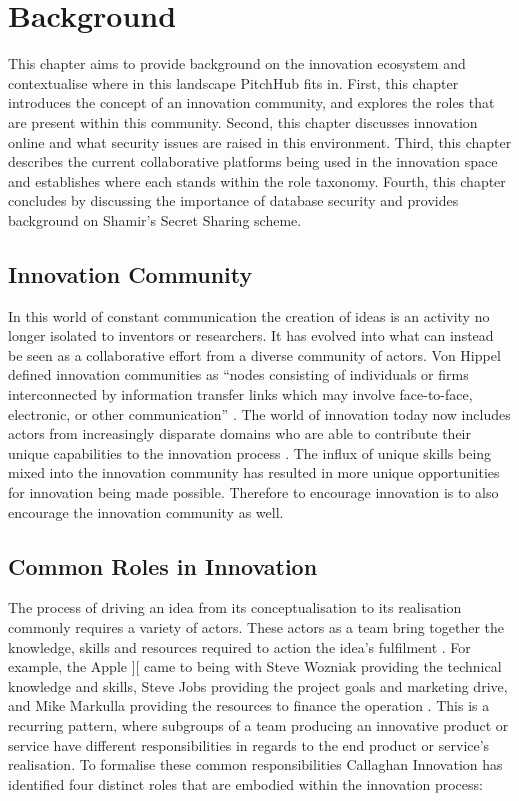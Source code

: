 \chapter{Background}\label{background}

This chapter aims to provide background on the innovation ecosystem and contextualise where in this landscape PitchHub fits in. First, this chapter introduces the concept of an innovation community, and explores the roles that are present within this community. Second, this chapter discusses innovation online and what security issues are raised in this environment. Third, this chapter describes the current collaborative platforms being used in the innovation space and establishes where each stands within the role taxonomy. Fourth, this chapter concludes by discussing the importance of database security and provides background on Shamir's Secret Sharing scheme.

\section{Innovation Community}
In this world of constant communication the creation of ideas is an activity no longer isolated to inventors or researchers. It has evolved into what can instead be seen as a collaborative effort from a diverse community of actors. Von Hippel defined innovation communities as ``nodes consisting of individuals or firms interconnected by information transfer links which may involve face-to-face, electronic, or other communication'' \cite{von2005democratizing}. The world of innovation today now includes actors from increasingly disparate domains who are able to contribute their unique capabilities to the innovation process \cite{che2003optimal}. The influx of unique skills being mixed into the innovation community has resulted in more unique opportunities for innovation being made possible. Therefore to encourage innovation is to also encourage the innovation community as well.

\section{Common Roles in Innovation}\label{commonRolesInInnovation}

The process of driving an idea from its conceptualisation to its realisation commonly requires a variety of actors. These actors as a team bring together the knowledge, skills and resources required to action the idea's fulfilment \cite{engelberger1982robotics}. For example, the Apple ][ came to being with Steve Wozniak providing the technical knowledge and skills, Steve Jobs providing the project goals and marketing drive, and Mike Markulla providing the resources to finance the operation \cite{livingston2007founders}. This is a recurring pattern, where subgroups of a team producing an innovative product or service have different responsibilities in regards to the end product or service's realisation. To formalise these common responsibilities Callaghan Innovation has identified four distinct roles that are embodied within the innovation process:

